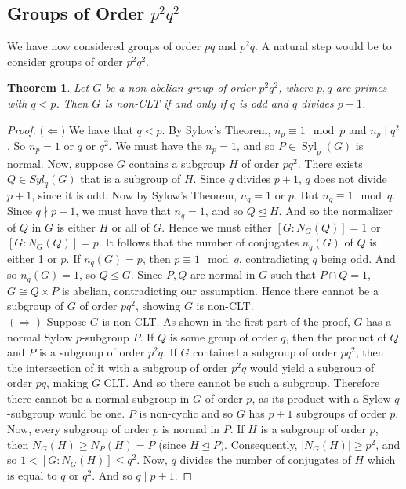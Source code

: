 \documentclass[12pt]{report}
\theoremstyle{newthm}
\newtheorem{Theorem}[lem]{Theorem}
\DeclareMathOperator{\Syl}{Syl}
\begin{document}
\subsection{Groups of Order $p^2q^2$}

We have now considered groups of order $pq$ and $p^2q$. A natural step would be to consider groups of order $p^2q^2$.

\begin{Theorem}\label{p^2q^2} \cite[pg 2]{Baskaran} Let $G$ be a non-abelian group of order $p^2q^2$, where $p,q$ are primes with $q<p$. Then $G$ is non-CLT if and only if $q$ is odd and $q$ divides $p+1$.

\end{Theorem}

\begin{proof}
$(\Leftarrow$) We have that $q<p$. By Sylow's Theorem, $n_p\equiv 1 \mod p$ and $n_p\mid q^2$. So $n_p=1$ or $q$ or $q^2$. We must have the $n_p=1$, and so $P\in \Syl_p(G)$ is normal. Now, suppose $G$ contains a subgroup $H$ of order $pq^2$. There exists $Q\in Syl_q(G)$ that is a subgroup of $H$. Since $q$ divides $p+1$, $q$ does not divide $p+1$, since it is odd. Now by Sylow's Theorem, $n_q=1$ or $p$. But $n_q\equiv 1 \mod q$. Since $q\nmid p-1$, we must have that $n_q=1$, and so $Q\trianglelefteq H$. And so the normalizer of $Q$ in $G$ is either $H$ or all of $G$. Hence we must either $[G:N_G(Q)]=1$ or $[G:N_G(Q)]=p$. It follows that the number of conjugates $n_q(G)$ of $Q$ is either 1 or $p$. If $n_q(G)=p$, then $p\equiv 1 \mod q$, contradicting $q$ being odd. And so $n_q(G)=1$, so $Q\trianglelefteq G$. Since $P, Q$ are normal in $G$ such that $P\cap Q = {1}$, $G\cong Q\times P$ is abelian, contradicting our assumption. Hence there cannot be a subgroup of $G$ of order $pq^2$, showing $G$ is non-CLT.\\
$(\Rightarrow)$ Suppose $G$ is non-CLT. As shown in the first part of the proof, $G$ has a normal Sylow $p$-subgroup $P$. If $Q$ is some group of order $q$, then the product of $Q$ and $P$ is a subgroup of order $p^2q$. If $G$ contained a subgroup of order $pq^2$, then the intersection of it with a subgroup of order $p^2q$ would yield a subgroup of order $pq$, making $G$ CLT. And so there cannot be such a subgroup. Therefore there cannot be a normal subgroup in $G$ of order $p$, as its product with a Sylow $q$-subgroup would be one. $P$ is non-cyclic and so $G$ has $p+1$ subgroups of order $p$. Now, every subgroup of order $p$ is normal in $P$. If $H$ is a subgroup of order $p$, then $N_G(H)\geq N_P(H)=P$ (since $H\trianglelefteq P)$. Consequently, $|N_G(H)|\geq p^2$, and so $1< [G: N_G(H)]\leq q^2$. Now, $q$ divides the number of conjugates of $H$ which is equal to $q$ or $q^2$. And so $q\mid p+1$.
\end{proof} 
\end{document}
